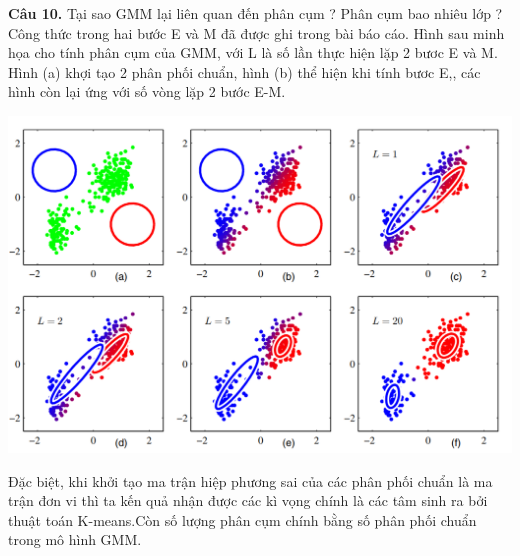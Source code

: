 \documentclass[13pt]{extreport}
\begin{document}
\textbf{Câu 10.} Tại sao GMM lại liên quan đến phân cụm ? Phân cụm bao nhiêu lớp ? \\
Công thức trong hai bước E và M đã được ghi trong bài báo cáo. Hình sau minh họa cho tính phân cụm của GMM, với L là số lần thực hiện lặp 2 bươc E và M. Hình (a) khợi tạo 2 phân phối chuẩn, hình (b) thể hiện khi tính bươc E,, các hình còn lại ứng với số vòng lặp 2 bước E-M.
\begin{center}
\includegraphics[scale=0.7]{gmm_exp.PNG}
\end{center}
Đặc biệt, khi khởi tạo ma trận hiệp phương sai của các phân phối chuẩn là ma trận đơn vi thì ta kến quả nhận được các kì vọng chính là các tâm sinh ra bởi thuật toán K-means.Còn số lượng phân cụm chính bằng số phân phối chuẩn trong mô hình GMM.
\end{document}
